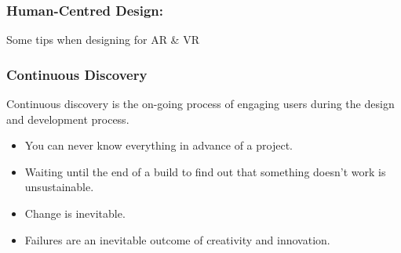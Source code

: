 {
      \begin{frame}[plain]
     \end{frame}
}

\begin{frame}
	\frametitle{Human-Centred Design:}
	Some tips when designing for AR \& VR
\end{frame}


\begin{frame}
	\frametitle{Continuous Discovery}
	Continuous discovery is the on-going process of engaging users during the design and development process. 
	\begin{itemize}
		\item \pause You can never know everything in advance of a project.
		\item \pause Waiting until the end of a build to find out that something doesn't work is unsustainable. 
		\item \pause Change is inevitable.
		\item \pause Failures are an inevitable outcome of creativity and innovation. 
	\end{itemize}
\end{frame}	

